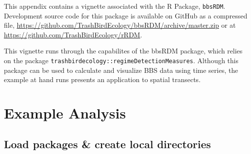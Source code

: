 \documentclass[12pt,twoside,openany]{reedthesis}
\begin{document}
This appendix contains a vignette associated with the R Package, \texttt{bbsRDM}. Development source code for this package is available on GitHub as a compressed file, \url{https://github.com/TrashBirdEcology/bbsRDM/archive/master.zip} or at \url{https://github.com/TrashBirdEcology/rRDM}.

This vignette runs through the capabilites of the bbsRDM package, which relies on the package \texttt{trashbirdecology::regimeDetectionMeasures}. Although this package can be used to calculate and visualize BBS data using time series, the example at hand runs presents an application to spatial transects.

\hypertarget{example-analysis-1}{%
\section{Example Analysis}\label{example-analysis-1}}

\hypertarget{load-packages-create-local-directories}{%
\subsection{Load packages \& create local directories}\label{load-packages-create-local-directories}}
\end{document}
